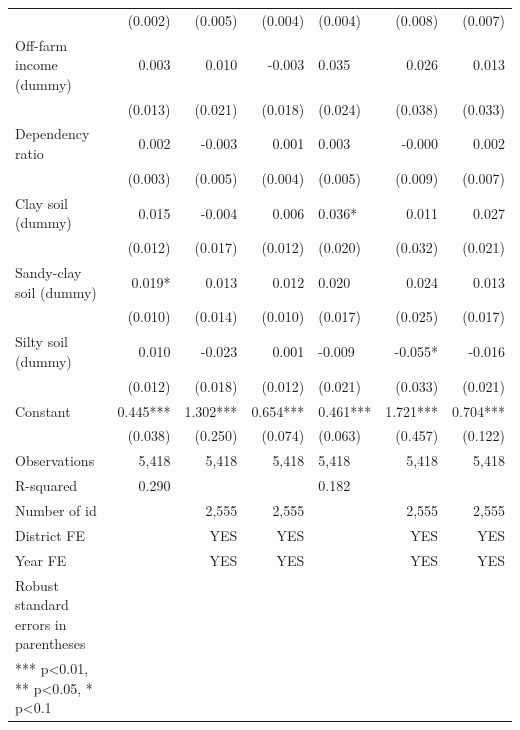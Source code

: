 \documentclass[
]{article}
\begin{document}
\begin{landscape}
\begin{longtable}[t]{lrrrlrr}
 & (0.002) & (0.005) & (0.004) & (0.004) & (0.008) & (0.007)\\
Off-farm income (dummy) & 0.003 & 0.010 & -0.003 & 0.035 & 0.026 & 0.013\\
 & (0.013) & (0.021) & (0.018) & (0.024) & (0.038) & (0.033)\\
Dependency ratio & 0.002 & -0.003 & 0.001 & 0.003 & -0.000 & 0.002\\
 & (0.003) & (0.005) & (0.004) & (0.005) & (0.009) & (0.007)\\
Clay soil (dummy) & 0.015 & -0.004 & 0.006 & 0.036* & 0.011 & 0.027\\
 & (0.012) & (0.017) & (0.012) & (0.020) & (0.032) & (0.021)\\
Sandy-clay soil (dummy) & 0.019* & 0.013 & 0.012 & 0.020 & 0.024 & 0.013\\
 & (0.010) & (0.014) & (0.010) & (0.017) & (0.025) & (0.017)\\
Silty soil (dummy) & 0.010 & -0.023 & 0.001 & -0.009 & -0.055* & -0.016\\
 & (0.012) & (0.018) & (0.012) & (0.021) & (0.033) & (0.021)\\
Constant & 0.445*** & 1.302*** & 0.654*** & 0.461*** & 1.721*** & 0.704***\\
 & (0.038) & (0.250) & (0.074) & (0.063) & (0.457) & (0.122)\\
Observations & 5,418 & 5,418 & 5,418 & 5,418 & 5,418 & 5,418\\
R-squared & 0.290 &  &  & 0.182 &  & \\
Number of id &  & 2,555 & 2,555 &  & 2,555 & 2,555\\
District FE &  & YES & YES &  & YES & YES\\
Year FE &  & YES & YES &  & YES & YES\\
Robust standard errors in parentheses &  &  &  &  &  & \\
*** p<0.01, ** p<0.05, * p<0.1 &  &  &  &  &  & \\*
\end{longtable}
\endgroup{}
\end{landscape}
\end{document}
